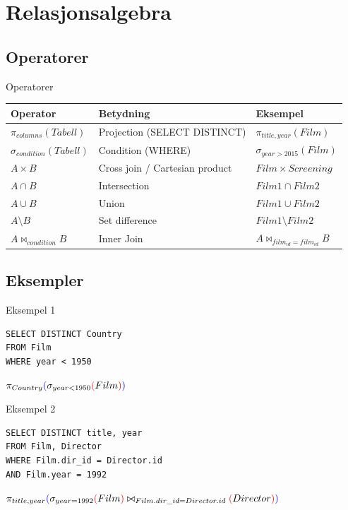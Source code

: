 \section{Relasjonsalgebra}
\subsection*{Operatorer}
\begin{frame}{Operatorer}
\begin{tabular}{l|l|l}
 Operator & Betydning & Eksempel\\\hline
 $\pi_{columns}(Tabell)$ & Projection (SELECT DISTINCT) & $\pi_{title, year}(Film)$\\\pause
 $\sigma_{condition}(Tabell)$ & Condition (WHERE) & $\sigma_{year > 2015}(Film)$\\\pause
 $A \times B$ & Cross join / Cartesian product & $Film \times Screening$\\\pause
 $A \cap B$ & Intersection & $Film1 \cap Film2$ \\\pause
 $A \cup B$ & Union & $Film1 \cup Film2$ \\\pause
 $A \setminus B$ & Set difference &  $Film1 \setminus Film2$\\\pause
 $A \bowtie_{condition} B$ & Inner Join & $A \bowtie_{film_{id}=film_{id}} B$
\end{tabular}
\end{frame}

\subsection*{Eksempler}
\begin{frame}[fragile]{Eksempel 1}
\begin{verbatim}
SELECT DISTINCT Country
FROM Film
WHERE year < 1950
\end{verbatim}
\pause
$\pi_{Country}\textcolor{blue}{(}\sigma_{year < 1950}\textcolor{red}{(}Film\textcolor{red}{)}\textcolor{blue}{)}$
\end{frame}

\begin{frame}[fragile]{Eksempel 2}
\begin{verbatim}
SELECT DISTINCT title, year
FROM Film, Director
WHERE Film.dir_id = Director.id
AND Film.year = 1992
\end{verbatim}
\pause
$\pi_{title, year}\textcolor{blue}{(}\sigma_{year = 1992}\textcolor{red}{(}Film\textcolor{red}{)} \bowtie_{Film.dir\_id=Director.id}\textcolor{red}{(}Director\textcolor{red}{)}\textcolor{blue}{)}$
\end{frame}

